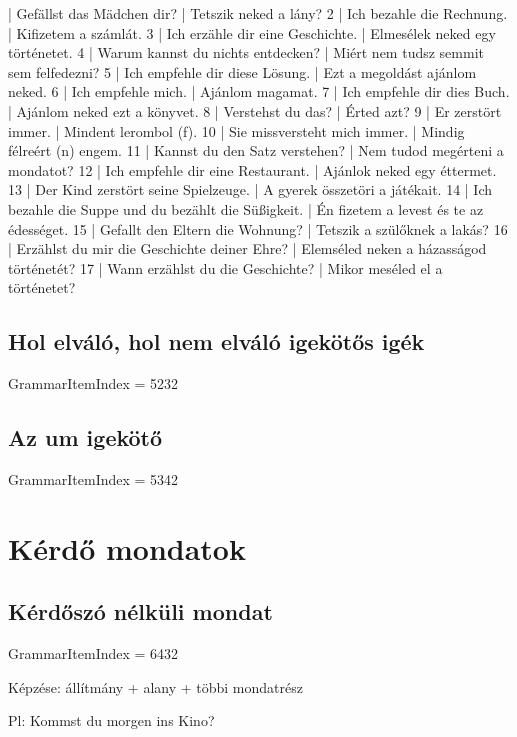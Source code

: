 \documentclass{article}
\newenvironment{desc}{\verbatim}{\endverbatim}
\newenvironment{exmp}{\verbatim}{\endverbatim}
\begin{document}
\begin{exmp}
1 | Gefällst das Mädchen dir? | Tetszik neked a lány?
2 | Ich bezahle die Rechnung. | Kifizetem a számlát.
3 | Ich erzähle dir eine Geschichte. | Elmesélek neked egy történetet.
4 | Warum kannst du nichts entdecken? | Miért nem tudsz semmit sem felfedezni?
5 | Ich empfehle dir diese Lösung. | Ezt a megoldást ajánlom neked.
6 | Ich empfehle mich. | Ajánlom magamat.
7 | Ich empfehle dir dies Buch. | Ajánlom neked ezt a könyvet.
8 | Verstehst du das? | Érted azt?
9 | Er zerstört immer. | Mindent lerombol (f).
10 | Sie missversteht mich immer. | Mindig félreért (n) engem.
11 | Kannst du den Satz verstehen? | Nem tudod megérteni a mondatot?
12 | Ich empfehle dir eine Restaurant. | Ajánlok neked egy éttermet.
13 | Der Kind zerstört seine Spielzeuge. | A gyerek összetöri a játékait.
14 | Ich bezahle die Suppe und du bezählt die Süßigkeit. | Én fizetem a levest és te az édességet.
15 | Gefallt den Eltern die Wohnung? | Tetszik a szülőknek a lakás?
16 | Erzählst du mir die Geschichte deiner Ehre? | Elemséled neken a házasságod történetét?
17 | Wann erzählst du die Geschichte? | Mikor meséled el a történetet?
\end{exmp}

\subsection{Hol elváló, hol nem elváló igekötős igék}

GrammarItemIndex = 5232

\subsection{Az um igekötő}

GrammarItemIndex = 5342

\section{Kérdő mondatok}

\subsection{Kérdőszó nélküli mondat}

GrammarItemIndex = 6432

\begin{desc}
Képzése: állítmány + alany + többi mondatrész

Pl: Kommst du morgen ins Kino?
\end{desc}
\end{document}

